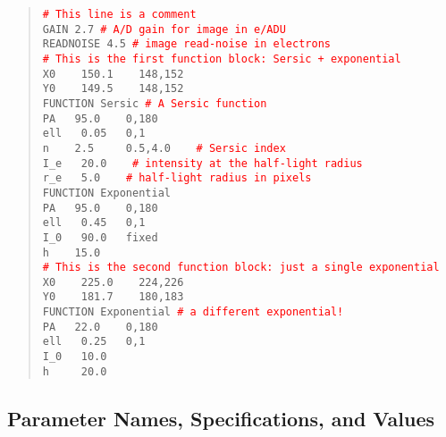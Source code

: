 \documentclass[10pt]{article}
\newcommand{\red}{\textcolor{red}}
\begin{document}
\begin{quote}
  \texttt{\red{\# This line is a comment}}\\
  
  \texttt{GAIN  2.7   \red{\# A/D gain for image in e/ADU}}\\
  \texttt{READNOISE  4.5   \red{\# image read-noise in electrons}}\\
  
  \texttt{\red{\# This is the first function block: Sersic + exponential}}\\
  \texttt{X0 ~~   150.1  ~~ 148,152}\\
  \texttt{Y0 ~~   149.5  ~~ 148,152}\\
  \texttt{FUNCTION   Sersic   \red{\# A Sersic function}}\\
  \texttt{PA  ~  95.0  ~~ 0,180}\\
  \texttt{ell ~   0.05 ~ 0,1}\\
  \texttt{n   ~~   2.5  ~~~ 0.5,4.0 ~~ \red{\# Sersic index}}\\
  \texttt{I\_e ~  20.0 ~~ \red{\# intensity at the half-light radius}}\\
  \texttt{r\_e ~    5.0 ~~ \red{\# half-light radius in pixels}}\\
  \texttt{FUNCTION   Exponential}\\
  \texttt{PA   ~ 95.0  ~~ 0,180}\\
  \texttt{ell  ~  0.45  ~~0,1}\\
  \texttt{I\_0 ~  90.0  ~ fixed}\\
  \texttt{h    ~~ 15.0}\\
  
  \texttt{\red{\# This is the second function block: just a single exponential}}\\
  \texttt{X0 ~~   225.0  ~~ 224,226}\\
  \texttt{Y0 ~~   181.7  ~~ 180,183}\\
  \texttt{FUNCTION   Exponential   \red{\# a different exponential!}}\\
  \texttt{PA   ~ 22.0  ~~ 0,180      }\\
  \texttt{ell  ~  0.25 ~ 0,1}\\
  \texttt{I\_0 ~  10.0  }\\
  \texttt{h   ~~~  20.0}\\
\end{quote}


\subsection{Parameter Names, Specifications, and Values}
\end{document}
